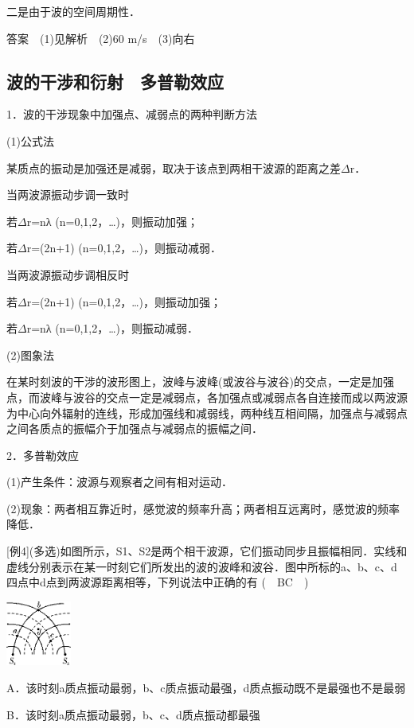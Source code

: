 二是由于波的空间周期性．

答案　(1)见解析　(2)60 m/s　(3)向右

\subsection{波的干涉和衍射　多普勒效应}

1．波的干涉现象中加强点、减弱点的两种判断方法

(1)公式法

某质点的振动是加强还是减弱，取决于该点到两相干波源的距离之差$\Delta$r．

当两波源振动步调一致时

若$\Delta$r=nλ (n=0,1,2，\ldots)，则振动加强；

若$\Delta$r=(2n+1) (n=0,1,2，\ldots)，则振动减弱．

当两波源振动步调相反时

若$\Delta$r=(2n+1) (n=0,1,2，\ldots)，则振动加强；

若$\Delta$r=nλ (n=0,1,2，\ldots)，则振动减弱．

(2)图象法

在某时刻波的干涉的波形图上，波峰与波峰(或波谷与波谷)的交点，一定是加强点，而波峰与波谷的交点一定是减弱点，各加强点或减弱点各自连接而成以两波源为中心向外辐射的连线，形成加强线和减弱线，两种线互相间隔，加强点与减弱点之间各质点的振幅介于加强点与减弱点的振幅之间．

2．多普勒效应

(1)产生条件：波源与观察者之间有相对运动．

(2)现象：两者相互靠近时，感觉波的频率升高；两者相互远离时，感觉波的频率降低．

{[}例4{]}(多选)如图所示，S1、S2是两个相干波源，它们振动同步且振幅相同．实线和虚线分别表示在某一时刻它们所发出的波的波峰和波谷．图中所标的a、b、c、d四点中d点到两波源距离相等，下列说法中正确的有
(　BC　)

\begin{center}\includegraphics[width=0.84931in,height=0.83958in]{media/image538.png}\end{center}
A．该时刻a质点振动最弱，b、c质点振动最强，d质点振动既不是最强也不是最弱

B．该时刻a质点振动最弱，b、c、d质点振动都最强

